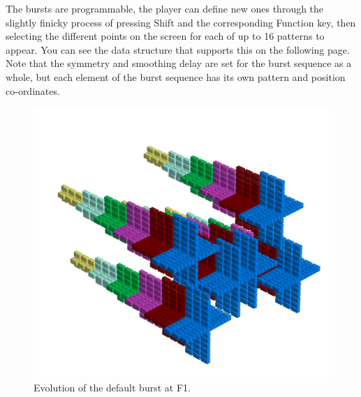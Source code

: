 The bursts are programmable, the player can define new ones through the slightly finicky process of pressing
Shift and the corresponding Function key, then selecting the different points on the screen for each of up
to 16 patterns to appear. You can see the data structure that supports this on the following page. Note
that the symmetry and smoothing delay are set for the burst sequence as a whole, but each element of the
burst sequence has its own pattern and position co-ordinates.

\clearpage
\begin{figure}[H]
    \centering
    \begin{adjustbox}{width=16cm,center}
      \includegraphics[width=12cm]{src/patterns/bursts/pattern0-45.png}%
    \end{adjustbox}
\caption{Evolution of the default burst at F1.}
\end{figure}
\clearpage

